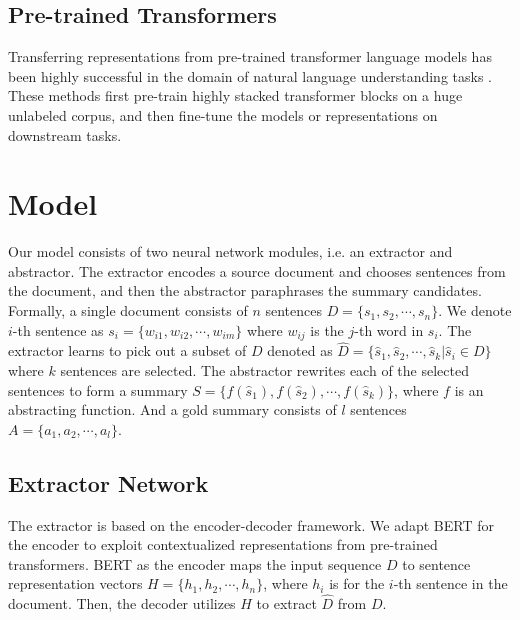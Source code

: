 \documentclass[11pt,a4paper]{article}
\begin{document}
\subsection{Pre-trained Transformers}

Transferring representations from pre-trained transformer language models
has been highly successful in the domain of natural language understanding tasks 
\cite{radford2018improving, devlin-etal-2019-bert, radford2019language, yang2019xlnet}.
These methods first pre-train highly stacked transformer blocks \cite{vaswani2017attention}
on a huge unlabeled corpus, and then fine-tune the models or representations
on downstream tasks.












\section{Model}

Our model consists of two neural network modules, i.e. an extractor and abstractor.
The extractor encodes a source document and chooses
sentences from the document, and then the abstractor
paraphrases the summary candidates.
Formally, a single document consists of $n$ sentences $D=\{s_1,s_2,\cdots,s_n\}$.
We denote $i$-th sentence as $s_i=\{w_{i1},w_{i2},\cdots,w_{im}\}$ where $w_{ij}$ is
the $j$-th word in $s_i$.
The extractor learns to pick out a subset of $D$ denoted as
$\hat{D}=\{\hat{s}_1,\hat{s}_2,\cdots,\hat{s}_k|\hat{s}_i\in D\}$
where $k$ sentences are selected. The abstractor rewrites each of the selected sentences
to form a summary $S=\{f(\hat{s}_1),f(\hat{s}_2),\cdots,f(\hat{s}_k)\}$,
where $f$ is an abstracting function.
And a gold summary consists of $l$ sentences $A=\{a_1,a_2,\cdots,a_l\}$.

\subsection{Extractor Network}

The extractor is based on the encoder-decoder framework.
We adapt BERT for the encoder to exploit contextualized
representations from pre-trained transformers. BERT as the
encoder maps the input sequence $D$ to sentence representation
vectors $H=\{h_1,h_2,\cdots,h_n\}$,
where $h_i$ is for the $i$-th sentence in the document.
Then, the decoder utilizes $H$ to extract $\hat{D}$ from $D$.
\end{document}
